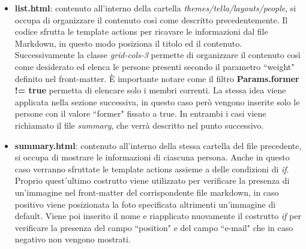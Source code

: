 \documentclass[target=bach,aauheader=]{thud}
\begin{document}
\begin{itemize}
    \item \textbf{list.html}: contenuto all'interno della cartella \textit{themes/tella/layouts/people}, si occupa di organizzare il contenuto così come descritto precedentemente.
    \newline
    Il codice sfrutta le template actions per ricavare le informazioni dal file Markdown, in questo modo posiziona il titolo ed il contenuto. Successivamente la classe \textit{grid-cols-3} permette di organizzare il contenuto così come desiderato ed elenca le persone presenti secondo il parametro ``weight" definito nel front-matter.
    È importante notare come il filtro \textbf{Params.former != true} permetta di elencare solo i membri correnti.
    \newline
    La stessa idea viene applicata nella sezione successiva, in questo caso però vengono inserite solo le persone con il valore ``former" fissato a true.
    \newline
    In entrambi i casi viene richiamato il file \textit{summary}, che verrà descritto nel punto successivo.
    \item \textbf{summary.html}: contenuto all'interno della stessa cartella del file precedente, si occupa di mostrare le informazioni di ciascuna persona. Anche in questo caso verranno sfruttate le template actions assieme a delle condizioni di \textit{if}.
    Proprio quest'ultimo costrutto viene utilizzato per verificare la presenza di un'immagine nel front-matter del corrispondente file markdown, in caso positivo viene posizionata la foto specificata altrimenti un'immagine di default. 
    Viene poi inserito il nome e riapplicato nuovamente il costrutto \textit{if} per verificare la presenza del campo ``position" e del campo ``e-mail" che in caso negativo non vengono mostrati.  
\end{itemize} 
\end{document}
